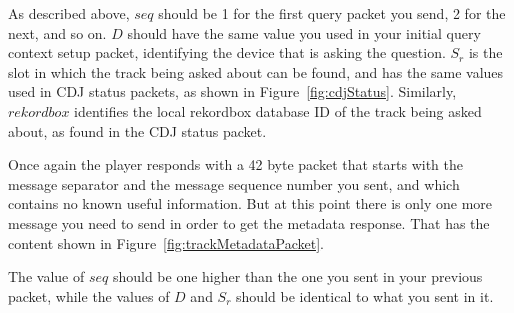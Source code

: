 \documentclass[11pt]{article}
\begin{document}
As described above, $seq$ should be 1 for the first query packet you
send, 2 for the next, and so on. $D$ should have the same value you
used in your initial query context setup packet, identifying the
device that is asking the question. $S_r$ is the slot in which the
track being asked about can be found, and has the same values used in
CDJ status packets, as shown in Figure~\ref{fig:cdjStatus}. Similarly,
$rekordbox$ identifies the local rekordbox database ID of the track
being asked about, as found in the CDJ status packet.

Once again the player responds with a 42 byte packet that starts with
the message separator and the message sequence number you sent, and
which contains no known useful information. But at this point there is
only one more message you need to send in order to get the metadata
response. That has the content shown in
Figure~\ref{fig:trackMetadataPacket}.

The value of $seq$ should be one higher than the one you sent in your
previous packet, while the values of $D$ and $S_r$ should be identical
to what you sent in it.
\end{document}
